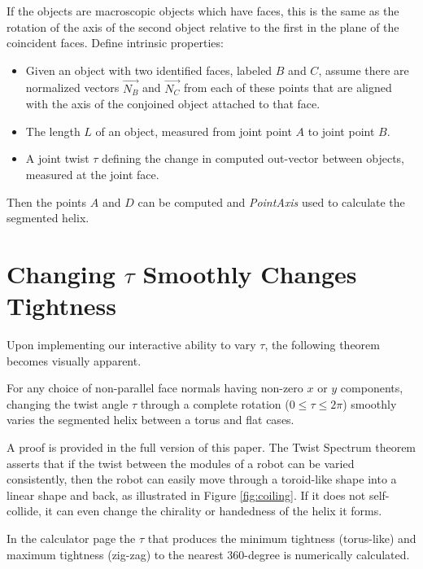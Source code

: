 \documentclass{svproc}
\begin{document}
If the objects are macroscopic objects which have faces, this is the same as the rotation
of the axis of the second object relative to the first in the plane of the coincident faces.
Define intrinsic properties:

\begin{itemize}
\item Given an object with two identified faces, labeled $B$ and $C$, assume there are normalized
  vectors $\overrightarrow{N_B}$ and $\overrightarrow{N_C}$
  from each of these points that are aligned with the axis of the conjoined object attached to
  that face.
\item The length $L$ of an object, measured from joint point $A$ to joint point $B$.
\item A joint twist $\tau$ defining the change in computed out-vector between objects,
  measured at the joint face.
\end{itemize}
Then the points $A$ and $D$ can be computed and {\em PointAxis} used to calculate the
segmented helix.

\section{Changing $\tau$ Smoothly Changes Tightness}

Upon implementing our interactive ability to vary $\tau$, the following
theorem becomes visually apparent.

\begin{theorem}
  For any choice of non-parallel face normals having non-zero $x$ or $y$ components,
  changing the twist angle $\tau$ through a complete rotation ($0 \leq \tau \leq 2\pi$)
  smoothly varies the segmented helix
  between a torus and flat cases.
\end{theorem}

A proof is provided in the full version of this paper\cite{readfullsegmentedhelix}.
The Twist Spectrum theorem asserts that if the twist between the modules of a robot
can be varied consistently, then the robot can easily move through a toroid-like shape
into a linear shape and back, as illustrated in Figure \ref{fig:coiling}. If it does not self-collide, it can even change the chirality
or handedness of the helix it forms.

In the calculator page
the $\tau$ that produces the minimum tightness (torus-like) and maximum tightness (zig-zag) to the
nearest 360-degree is numerically calculated.
\end{document}
